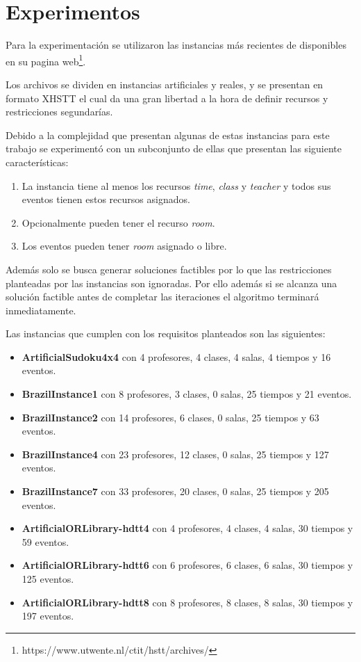 \documentclass[letter, 10pt]{article}
\renewcommand{\bf}[1]{\textbf{#1}}
\begin{document}
\section{Experimentos}\label{sec:exp}
Para la experimentación se utilizaron las instancias más recientes de 
\cite{post2016third} disponibles en su pagina 
web\footnote{https://www.utwente.nl/ctit/hstt/archives/}.

Los archivos se dividen en instancias artificiales y reales, y se presentan en
formato XHSTT\cite{post2014xhstt} el cual da una gran libertad a la hora de
definir recursos y restricciones segundarías.

Debido a la complejidad que presentan algunas de estas instancias para este
trabajo se experimentó con un subconjunto de ellas que presentan las siguiente
características:
\begin{enumerate}
  \item
    La instancia tiene al menos los recursos \emph{time}, \emph{class} y
    \emph{teacher} y todos sus eventos tienen estos recursos asignados.
  \item
    Opcionalmente pueden tener el recurso \emph{room}.
  \item
    Los eventos pueden tener \emph{room} asignado o libre.
\end{enumerate}

Además solo se busca generar soluciones factibles por lo que las restricciones
planteadas por las instancias son ignoradas. Por ello además si se alcanza una
solución factible antes de completar las iteraciones el algoritmo terminará
inmediatamente.

Las instancias que cumplen con los requisitos planteados son las siguientes:
\begin{itemize}
  \item \bf{ArtificialSudoku4x4}
    con 4 profesores, 4 clases, 4 salas, 4 tiempos y 16 eventos.
  \item \bf{BrazilInstance1}
    con 8 profesores, 3 clases, 0 salas, 25 tiempos y 21 eventos.
  \item \bf{BrazilInstance2}
    con 14 profesores, 6 clases, 0 salas, 25 tiempos y 63 eventos.
  \item \bf{BrazilInstance4}
    con 23 profesores, 12 clases, 0 salas, 25 tiempos y 127 eventos.
  \item \bf{BrazilInstance7}
    con 33 profesores, 20 clases, 0 salas, 25 tiempos y 205 eventos.
  \item \bf{ArtificialORLibrary-hdtt4}
    con 4 profesores, 4 clases, 4 salas, 30 tiempos y 59 eventos.
  \item \bf{ArtificialORLibrary-hdtt6}
    con 6 profesores, 6 clases, 6 salas, 30 tiempos y 125 eventos.
  \item \bf{ArtificialORLibrary-hdtt8}
    con 8 profesores, 8 clases, 8 salas, 30 tiempos y 197 eventos.
\end{itemize}
\end{document}
